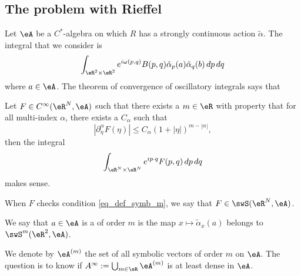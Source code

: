 \subsection{The problem with Rieffel}


Let $\eA$ be a $C^*$-algebra on which $R$ has a strongly continuous action $\tilde\alpha$. The integral that we consider is
\[
	\int_{\eR^2\times\eR^2}e^{i\omega(p,q)}B(p,q)\tilde\alpha_p(a)\tilde\alpha_q(b)\,dp\,dq
\]
where $a\in\eA$. The theorem of convergence of oscillatory integrals says that

\begin{theorem}
	Let $F\in C^{\infty}(\eR^N,\eA)$ such that there exists a $m\in\eR$ with property that for all multi-index $\alpha$, there exists a $C_{\alpha}$ such that
	\begin{equation} \label{eq_def_symb_m}
		| \partial^{\alpha}_{\eta}F(\eta) |\leq C_{\alpha}(1+| \eta |)^{m-| \alpha |},
	\end{equation}
	then the integral
	\[
		\int_{\eR^N\times\eR^N} e^{ip\cdot q}F(p,q)\,dp\,dq
	\]
	makes sense.

\end{theorem}
When $F$ checks condition \eqref{eq_def_symb_m}, we say that $F\in\swS(\eR^N,\eA)$.

\begin{definition}
	We say that $a\in\eA$ is a  of order $m$ is the map $x\mapsto\tilde\alpha_x(a)$ belongs to $\swS^m(\eR^2,\eA)$.
\end{definition}
We denote by $\eA^{(m)}$ the set of all symbolic vectors of order $m$ on $\eA$. The question is to know if $A^{\infty}:=\bigcup_{m\in\eR}\eA^{(m)}$ is at least dense in $\eA$.


